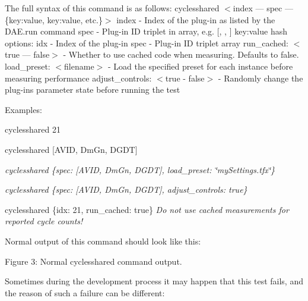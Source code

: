 The full syntax of this command is as follows\+:  {\ttfamily cyclesshared $<$index — spec — \{key\+:value, key\+:value, etc.\}$>$}   {\ttfamily index} -\/ Index of the plug-\/in as listed by the {\ttfamily D\+A\+E.\+run} command  {\ttfamily spec} -\/ Plug-\/in ID triplet in array, e.\+g. \mbox{[}\textquotesingle{}, \textquotesingle{}, \textquotesingle{}\mbox{]}  {\ttfamily key\+:value} hash options\+:   {\ttfamily idx} -\/ Index of the plug-\/in  {\ttfamily spec} -\/ Plug-\/in ID triplet array  {\ttfamily run\+\_\+cached\+: $<$true — false$>$} -\/ Whether to use cached code when measuring. Defaults to false.  {\ttfamily load\+\_\+preset\+: $<$filename$>$} -\/ Load the specified preset for each instance before measuring performance  {\ttfamily adjust\+\_\+controls\+: $<$true -\/ false$>$} -\/ Randomly change the plug-\/in\textquotesingle{}s parameter state before running the test

Examples\+: 
\begin{DoxyItemize}
\item {\ttfamily cyclesshared 21 } 
\item {\ttfamily cyclesshared \mbox{[}\textquotesingle{}A\+V\+ID\textquotesingle{}, \textquotesingle{}Dm\+Gn\textquotesingle{}, \textquotesingle{}D\+G\+DT\textquotesingle{}\mbox{]}}  
\item {\itshape {\ttfamily cyclesshared \{spec\+: \mbox{[}\textquotesingle{}A\+V\+ID\textquotesingle{}, \textquotesingle{}Dm\+Gn\textquotesingle{}, \textquotesingle{}D\+G\+DT\textquotesingle{}\mbox{]}, load\+\_\+preset\+: \char`\"{}my\+Settings.\+tfx\char`\"{}\} }} 
\item {\itshape {\ttfamily cyclesshared \{spec\+: \mbox{[}\textquotesingle{}A\+V\+ID\textquotesingle{}, \textquotesingle{}Dm\+Gn\textquotesingle{}, \textquotesingle{}D\+G\+DT\textquotesingle{}\mbox{]}, adjust\+\_\+controls\+: true\} }} 
\item {\ttfamily cyclesshared \{idx\+: 21, run\+\_\+cached\+: true\} } {\itshape Do not use cached measurements for reported cycle counts!} 
\end{DoxyItemize}

Normal output of this command should look like this\+:

 Figure 3\+: Normal cyclesshared command output.

Sometimes during the development process it may happen that this test fails, and the reason of such a failure can be different\+:


